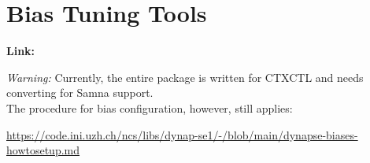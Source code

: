   \chapter{Bias Tuning Tools}
 \label{appendix:bias_tuning_tools}

\textbf{Link:} \url{}

 \textit{Warning:} Currently, the entire package is written for CTXCTL and needs converting for Samna support.\\

 The procedure for bias configuration, however, still applies:

 \url{https://code.ini.uzh.ch/ncs/libs/dynap-se1/-/blob/main/dynapse-biases-howtosetup.md}
 